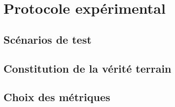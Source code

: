 
\section{Protocole expérimental}


\subsection{Scénarios de test}

\subsection{Constitution de la vérité terrain}

\subsection{Choix des métriques}
